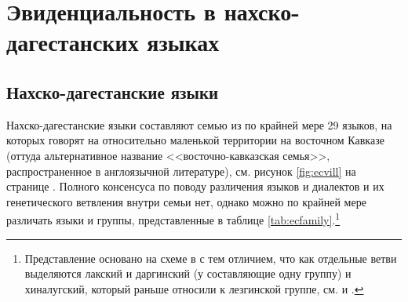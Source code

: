 

\color{black}

\chapter{Эвиденциальность в нахско-дагестанских языках}

\section{Нахско-дагестанские языки} \label{sec:ndlang}

Нахско-дагестанские языки составляют семью из по крайней мере 29 языков, на которых говорят на относительно маленькой территории на восточном Кавказе (оттуда альтернативное название <<восточно-кавказская семья>>, распространенное в англоязычной литературе), см. рисунок \ref{fig:ecvill} на странице \pageref{map}. Полного консенсуса по поводу различения языков и диалектов и их генетического ветвления внутри семьи нет, однако можно по крайней мере различать языки и группы, представленные в таблице \ref{tab:ecfamily}.\footnote{Представление основано на схеме в \citep[182]{vandenberg2005} с тем отличием, что как отдельные ветви выделяются лакский и даргинский (у \citep{vandenberg2005} составляющие одну группу) и хиналугский, который раньше относили к лезгинской группе, см. \citep{alekseev1985} и \citep[207]{nichols2003}.}

